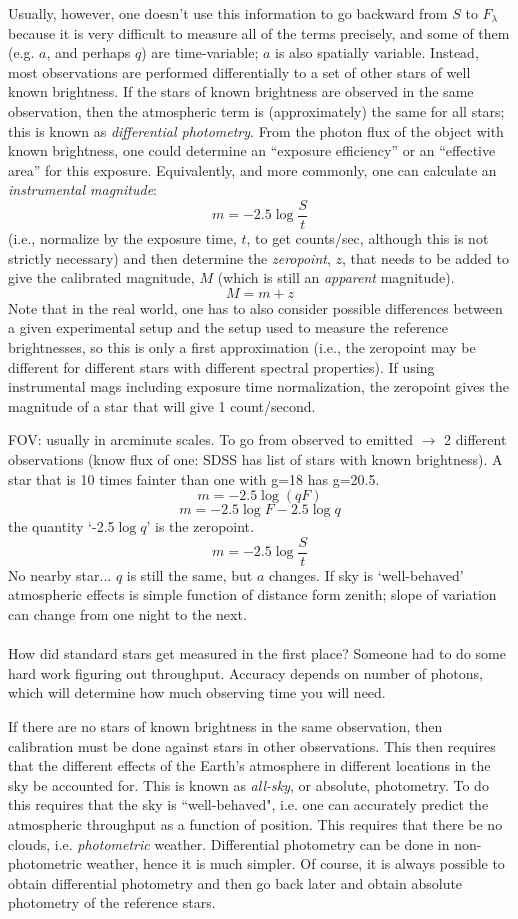 \documentclass[12pt]{article}
\begin{document}
Usually, however, one doesn't use this information to go
backward from $S$ to $F_{\lambda}$ because it is very
difficult to measure all of the terms precisely, and some of them
(e.g. $a$, and perhaps $q$) are time-variable; $a$ is also spatially
variable. Instead, most observations are performed differentially to a
set of other stars of well known brightness. If the stars of known
brightness are observed in the same observation, then the atmospheric
term is (approximately) the same for all stars; this is known as
\emph{differential photometry}.
From the photon flux of the object with known
brightness, one could determine an ``exposure efficiency''
or an ``effective area'' for this
exposure. Equivalently, and more commonly, one can calculate an
\emph{instrumental magnitude}:
    $$  m = -2.5 \log \frac{S}{t} $$
(i.e., normalize by the exposure time, $t$, to get counts/sec, although this
is not strictly necessary) and then determine the \emph{zeropoint},
$z$, that needs
to be added to give the calibrated magnitude, $M$
(which is still an \emph{apparent} magnitude).
    $$ M = m + z $$
Note that in the real world, one has to also consider possible
differences between a given experimental setup and the setup used to
measure the reference brightnesses, so this is only a first
approximation (i.e., the zeropoint may be different for different
stars with different spectral properties). If using instrumental mags
including exposure time normalization, the zeropoint gives the
magnitude of a star that will give 1 count/second.

\textcolor{myBlue}{FOV: usually in arcminute scales.
To go from observed to emitted $\rightarrow$ 2 different observations
(know flux of one: SDSS has list of stars with known brightness).
A star that is 10 times fainter than one with g=18 has g=20.5.
    $$ m = -2.5 \log(qF)$$
    $$ m = -2.5 \log F - 2.5\log q $$
the quantity `-2.5$\log q$' is the zeropoint.
    $$ m = -2.5 \log \frac{S}{t} $$
No nearby star... $q$ is still the same, but $a$ changes.
If sky is `well-behaved' atmospheric effects is simple function
of distance form zenith; slope of variation can change from one
night to the next.\\\\
How did standard stars get measured in the first place?
Someone had to do some hard work figuring out throughput.
Accuracy depends on number of photons, which will determine
how much observing time you will need.}

If there are no stars of known brightness in the same
observation, then calibration must be done against stars in other
observations. This then requires that the different effects of the
Earth's atmosphere in different locations in the sky be accounted for.
This is known as \emph{all-sky}, or absolute, photometry. To do this requires
that the sky is ``well-behaved", i.e. one can accurately predict the
atmospheric throughput as a function of position. This requires that
there be no clouds, i.e. \emph{photometric} weather. Differential photometry
can be done in non-photometric weather, hence it is much simpler. Of
course, it is always possible to obtain differential photometry and
then go back later and obtain absolute photometry of the reference
stars.
\end{document}
